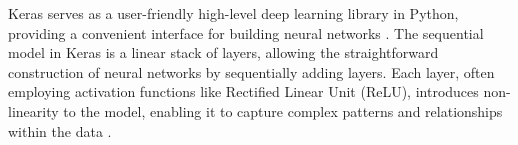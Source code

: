 Keras serves as a user-friendly high-level deep learning library in Python, providing a convenient interface for building neural networks \citep{gulli_deep_2017}. The sequential model in Keras is a linear stack of layers, allowing the straightforward construction of neural networks by sequentially adding layers. Each layer, often employing activation functions like Rectified Linear Unit (ReLU), introduces non-linearity to the model, enabling it to capture complex patterns and relationships within the data \citep{gulli_deep_2017}. 


